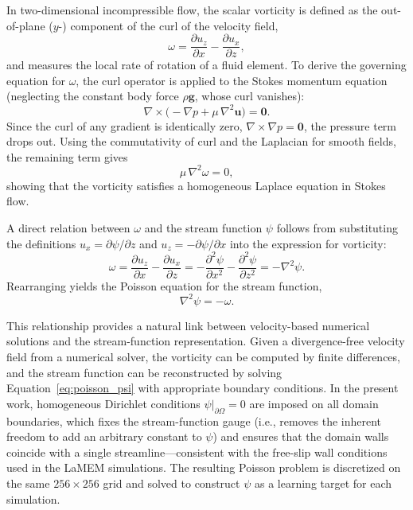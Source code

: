In two-dimensional incompressible flow, the scalar vorticity is defined as the
out-of-plane ($y$-) component of the curl of the velocity field,
\begin{equation}
\omega = \frac{\partial u_z}{\partial x}
       - \frac{\partial u_x}{\partial z},
\end{equation}
and measures the local rate of rotation of a fluid element. To derive the
governing equation for $\omega$, the curl operator is applied to the Stokes
momentum equation (neglecting the constant body force $\rho\mathbf{g}$, whose
curl vanishes):
\begin{equation}
\nabla \times \bigl(-\nabla p + \mu\,\nabla^2 \mathbf{u}\bigr) = \mathbf{0}.
\end{equation}
Since the curl of any gradient is identically zero, $\nabla \times \nabla p =
\mathbf{0}$, the pressure term drops out. Using the commutativity of curl and
the Laplacian for smooth fields, the remaining term gives
\begin{equation}
\mu\,\nabla^2 \omega = 0,
\end{equation}
showing that the vorticity satisfies a homogeneous Laplace equation in Stokes
flow.

A direct relation between $\omega$ and the stream function $\psi$ follows from
substituting the definitions $u_x = \partial\psi/\partial z$ and
$u_z = -\partial\psi/\partial x$ into the expression for vorticity:
\begin{equation}
\omega
= \frac{\partial u_z}{\partial x} - \frac{\partial u_x}{\partial z}
= -\frac{\partial^2 \psi}{\partial x^2} - \frac{\partial^2 \psi}{\partial z^2}
= -\nabla^2 \psi.
\end{equation}
Rearranging yields the Poisson equation for the stream function,
\begin{equation}
\label{eq:poisson_psi}
\nabla^2 \psi = -\omega.
\end{equation}

This relationship provides a natural link between velocity-based numerical
solutions and the stream-function representation. Given a divergence-free
velocity field from a numerical solver, the vorticity can be computed by
finite differences, and the stream function can be reconstructed by solving
Equation~\eqref{eq:poisson_psi} with appropriate boundary conditions.
In the present work, homogeneous Dirichlet conditions $\psi|_{\partial\Omega} = 0$
are imposed on all domain boundaries, which fixes the stream-function gauge
(i.e., removes the inherent freedom to add an arbitrary constant to $\psi$)
and ensures that the domain walls coincide with a single streamline—consistent with the free-slip wall conditions used in the LaMEM simulations.
The resulting Poisson problem is discretized on the same $256 \times 256$
grid and solved to construct $\psi$ as a learning target for each simulation.

